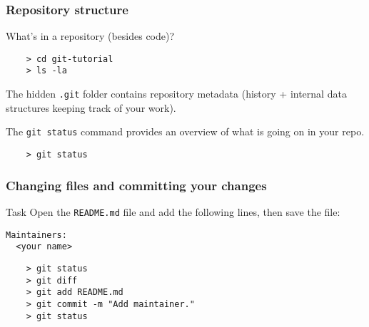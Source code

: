 
\begin{frame}[fragile]
	\frametitle{Repository structure}
	
	What's in a repository (besides code)?
	
	\begin{verbatim}
	> cd git-tutorial
	> ls -la
	\end{verbatim}
	
	The hidden \texttt{.git} folder contains repository metadata (history + internal data structures keeping track of your work).
	
	The \texttt{git status} command provides an overview of what is going on in your repo.
	\begin{verbatim}
	> git status
	\end{verbatim}
	
\end{frame}


\begin{frame}[fragile]
	\frametitle{Changing files and committing your changes}
	
	\begin{block}{Task}
	Open the \texttt{README.md} file and add the following lines, then save the file:
	\begin{verbatim}
Maintainers:
  <your name>
	\end{verbatim}
	\end{block}
	
	\begin{verbatim}
	> git status
	> git diff
	> git add README.md
	> git commit -m "Add maintainer."
	> git status
	\end{verbatim}


	
\end{frame}

